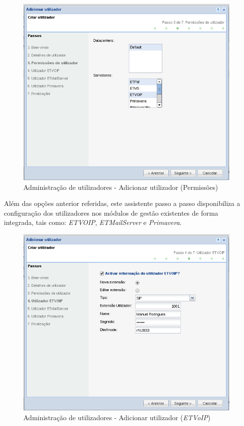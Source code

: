 {\begin{figure}[H]
        \begin{center}
        \includegraphics[scale=0.4]{screenshots/users/etva/create_user_wiz_03.png}
        \caption{Administração de utilizadores - Adicionar utilizador (Permissões)}
        \label{fig:create_user_wiz_03}
        \end{center}
\end{figure}

Além das opções anterior referidas, este assistente passo a passo disponibiliza a configuração dos utilizadores nos módulos de gestão existentes de forma integrada, tais como: \textit{ETVOIP}, \textit{ETMailServer} e \textit{Primavera}.

\begin{figure}[H]
        \begin{center}
        \includegraphics[scale=0.4]{screenshots/users/etva/create_user_wiz_04.png}
        \caption{Administração de utilizadores - Adicionar utilizador (\textit{ETVoIP})}
        \label{fig:create_user_wiz_04}
        \end{center}
\end{figure}

}
